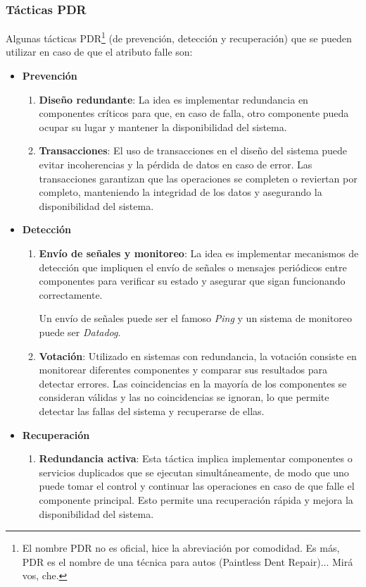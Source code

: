 \documentclass{article}
\begin{document}
		
		\subsubsection{Tácticas PDR}\label{sec:tacticas_disponibilidad}
			Algunas tácticas PDR\footnote{El nombre PDR no es oficial, hice la abreviación por comodidad. Es más, PDR es el nombre de una técnica para autos (Paintless Dent Repair)... Mirá vos, che.} (de prevención, detección y recuperación) que se pueden utilizar en caso de que el atributo falle son:
			
			\begin{itemize}		
				\item \textbf{Prevención}
				\begin{enumerate}
					\item \textbf{Diseño redundante}: La idea es implementar redundancia en componentes críticos para que, en caso de falla, otro componente pueda ocupar su lugar y mantener la disponibilidad del sistema.
					
					\item \textbf{Transacciones}: El uso de transacciones en el diseño del sistema puede evitar incoherencias y la pérdida de datos en caso de error. Las transacciones garantizan que las operaciones se completen o reviertan por completo, manteniendo la integridad de los datos y asegurando la disponibilidad del sistema.
				\end{enumerate}
				\item \textbf{Detección}
				\begin{enumerate}
					\item \textbf{Envío de señales y monitoreo}: La idea es implementar mecanismos de detección que impliquen el envío de señales o mensajes periódicos entre componentes para verificar su estado y asegurar que sigan funcionando correctamente. 
				
					Un envío de señales puede ser el famoso \textit{Ping} y un sistema de monitoreo puede ser \textit{Datadog}.
					
					\item \textbf{Votación}: Utilizado en sistemas con redundancia, la votación consiste en monitorear diferentes componentes y comparar sus resultados para detectar errores. Las coincidencias en la mayoría de los componentes se consideran válidas y las no coincidencias se ignoran, lo que permite detectar las fallas del sistema y recuperarse de ellas.
				\end{enumerate}
				
				\item \textbf{Recuperación}
				\begin{enumerate}
					\item \textbf{Redundancia activa}: Esta táctica implica implementar componentes o servicios duplicados que se ejecutan simultáneamente, de modo que uno puede tomar el control y continuar las operaciones en caso de que falle el componente principal. Esto permite una recuperación rápida y mejora la disponibilidad del sistema.
					

\end{enumerate}
\end{itemize}
\end{document}
